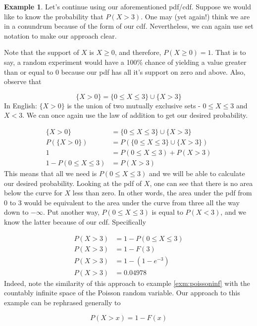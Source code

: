 \documentclass[
]{book}
\theoremstyle{definition}
\theoremstyle{definition}
\newtheorem{example}{Example}[chapter]
\theoremstyle{definition}
\theoremstyle{definition}
\theoremstyle{remark}
\begin{document}
\begin{example}
Let's continue using our aforementioned pdf/cdf. Suppose we would like to know the probability that \(P(X > 3)\). One may (yet again!) think we are in a conundrum because of the form of our cdf. Nevertheless, we can again use set notation to make our approach clear.

Note that the support of \(X\) is \(X \geq 0\), and therefore, \(P(X \geq 0) = 1\). That is to say, a random experiment would have a 100\% chance of yielding a value greater than or equal to 0 because our pdf has all it's support on zero and above. Also, observe that

\[
\{X > 0\} = \{0 \leq X \leq 3\} \cup \{X > 3\} 
\]
In English: \(\{X > 0\}\) is the union of two mutually exclusive sets - \(0 \leq X \leq 3\) and \(X < 3\). We can once again use the law of addition to get our desired probability.

\begin{align}
\{X > 0\} &= \{0 \leq X \leq 3\} \cup \{X > 3\} \\
P(\{X > 0\}) &= P(\{0 \leq X \leq 3\} \cup \{X > 3\}) \\
1 &= P(0 \leq X \leq 3) + P(X > 3) \\
1 - P(0 \leq X \leq 3) &= P(X > 3)
\end{align}
This means that all we need is \(P(0 \leq X \leq 3)\) and we will be able to calculate our desired probability. Looking at the pdf of \(X\), one can see that there is no area below the curve for \(X\) less than zero. In other words, the area under the pdf from 0 to 3 would be equivalent to the area under the curve from three all the way down to \(-\infty\). Put another way, \(P(0 \leq X \leq 3)\) is equal to \(P(X < 3)\), and we know the latter because of our cdf. Specifically

\begin{align}
P(X > 3) &= 1 - P(0 \leq X \leq 3) \\
P(X > 3) &= 1 - F(3) \\
P(X > 3) &= 1 - (1 - e^{-3}) \\
P(X > 3) &= 0.04978  
\end{align}
Indeed, note the similarity of this approach to example \ref{exm:poissoninf} with the countably infinite space of the Poisson random variable. Our approach to this example can be rephrased generally to

\[
P(X > x) = 1 - F(x)
\label{eq:infinitycont}
\]
\end{example}
\end{document}
